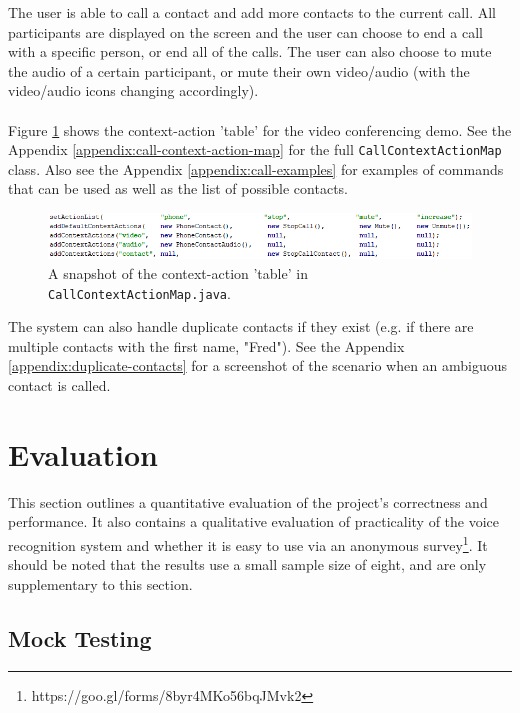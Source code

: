 \documentclass[11pt]{article}
\begin{document}
The user is able to call a contact and add more contacts to the current call. All participants are displayed on the screen and the user can choose to end a call with a specific person, or end all of the calls. The user can also choose to mute the audio of a certain participant, or mute their own video/audio (with the video/audio icons changing accordingly).
\\
\\
Figure \ref{fig:call-context-action-map} shows the context-action 'table' for the video conferencing demo. See the Appendix \ref{appendix:call-context-action-map} for the full \texttt{CallContextActionMap} class. Also see the Appendix \ref{appendix:call-examples} for examples of commands that can be used as well as the list of possible contacts.

\begin{center}
\begin{figure}[H]
\begin{center}
  \includegraphics[width=\linewidth]{call-context-action-map.png}
  \caption{A snapshot of the context-action 'table' in \texttt{CallContextActionMap.java}.}
  \label{fig:call-context-action-map}
  \end{center}
\end{figure}
\end{center}

The system can also handle duplicate contacts if they exist (e.g. if there are multiple contacts with the first name, "Fred"). See the Appendix \ref{appendix:duplicate-contacts} for a screenshot of the scenario when an ambiguous contact is called.

\newpage
\section{Evaluation}
\label{evaluation}

This section outlines a quantitative evaluation of the project's correctness and performance. It also contains a qualitative evaluation of practicality of the voice recognition system and whether it is easy to use via an anonymous survey\footnote{https://goo.gl/forms/8byr4MKo56bqJMvk2}. It should be noted that the results use a small sample size of eight, and are only supplementary to this section.

\subsection{Mock Testing}
\label{section:mock-testing}
\end{document}
